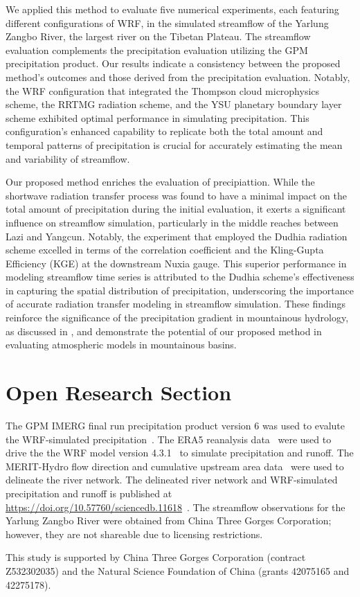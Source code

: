 \documentclass[draft]{agujournal2019}
\begin{document}
We applied this method to evaluate five numerical experiments, each featuring different configurations of WRF, in the simulated streamflow of the Yarlung Zangbo River, the largest river on the Tibetan Plateau. The streamflow evaluation complements the precipitation evaluation utilizing the GPM precipitation product. Our results indicate a consistency between the proposed method's outcomes and those derived from the precipitation evaluation. Notably, the WRF configuration that integrated the Thompson cloud microphysics scheme, the RRTMG radiation scheme, and the YSU planetary boundary layer scheme exhibited optimal performance in simulating precipitation. This configuration's enhanced capability to replicate both the total amount and temporal patterns of precipitation is crucial for accurately estimating the mean and variability of streamflow.

Our proposed method enriches the evaluation of precipiattion. While the shortwave radiation transfer process was found to have a minimal impact on the total amount of precipitation during the initial evaluation, it exerts a significant influence on streamflow simulation, particularly in the middle reaches between Lazi and Yangcun. Notably, the experiment that employed the Dudhia radiation scheme excelled in terms of the correlation coefficient and the Kling-Gupta Efficiency (KGE) at the downstream Nuxia gauge. This superior performance in modeling streamflow time series is attributed to the Dudhia scheme's effectiveness in capturing the spatial distribution of precipitation, underscoring the importance of accurate radiation transfer modeling in streamflow simulation. These findings reinforce the significance of the precipitation gradient in mountainous hydrology, as discussed in \cite{immerzeel2014WRR}, and demonstrate the potential of our proposed method in evaluating atmospheric models in mountainous basins.

\section*{Open Research Section}

The GPM IMERG final run precipitation product version 6 was used to evalute the WRF-simulated precipitation~\cite{huffman2019GPM}. The ERA5 reanalysis data~\cite{hersbach2020QJRMS} were used to drive the the WRF model version 4.3.1~\cite{powers2017BAMS} to simulate precipitation and runoff. The MERIT-Hydro flow direction and cumulative upstream area data~\cite{yamazaki2019WRR} were used to delineate the river network. The delineated river network and WRF-simulated precipitation and runoff is published at \url{https://doi.org/10.57760/sciencedb.11618}~\cite{zheng2024SCB}. The streamflow observations for the Yarlung Zangbo River were obtained from China Three Gorges Corporation; however, they are not shareable due to licensing restrictions.

\acknowledgments

This study is supported by China Three Gorges Corporation (contract Z532302035) and the Natural Science Foundation of China (grants 42075165 and 42275178).


\end{document}
